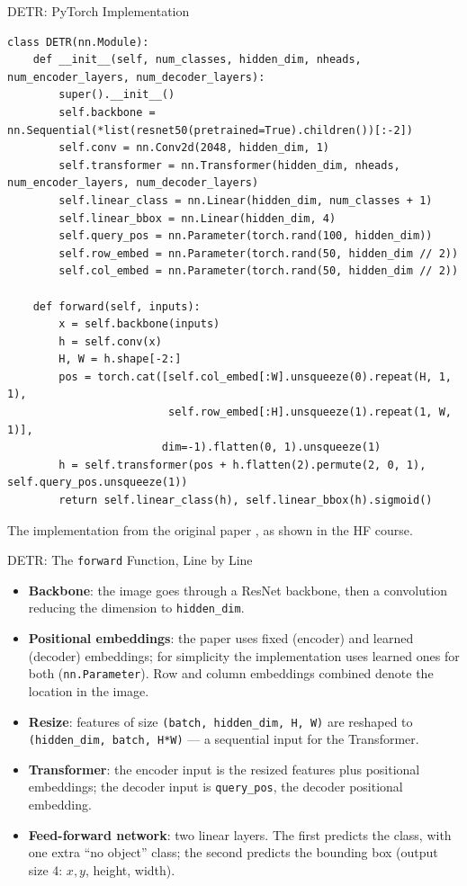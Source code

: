 \begin{frame}[fragile]{DETR: PyTorch Implementation}
\vspace{-0.3cm}
\tiny
\begin{verbatim}
class DETR(nn.Module):
    def __init__(self, num_classes, hidden_dim, nheads, num_encoder_layers, num_decoder_layers):
        super().__init__()
        self.backbone = nn.Sequential(*list(resnet50(pretrained=True).children())[:-2])
        self.conv = nn.Conv2d(2048, hidden_dim, 1)
        self.transformer = nn.Transformer(hidden_dim, nheads, num_encoder_layers, num_decoder_layers)
        self.linear_class = nn.Linear(hidden_dim, num_classes + 1)
        self.linear_bbox = nn.Linear(hidden_dim, 4)
        self.query_pos = nn.Parameter(torch.rand(100, hidden_dim))
        self.row_embed = nn.Parameter(torch.rand(50, hidden_dim // 2))
        self.col_embed = nn.Parameter(torch.rand(50, hidden_dim // 2))

    def forward(self, inputs):
        x = self.backbone(inputs)
        h = self.conv(x)
        H, W = h.shape[-2:]
        pos = torch.cat([self.col_embed[:W].unsqueeze(0).repeat(H, 1, 1),
                         self.row_embed[:H].unsqueeze(1).repeat(1, W, 1)],
                        dim=-1).flatten(0, 1).unsqueeze(1)
        h = self.transformer(pos + h.flatten(2).permute(2, 0, 1), self.query_pos.unsqueeze(1))
        return self.linear_class(h), self.linear_bbox(h).sigmoid()
\end{verbatim}
\normalsize
\vspace{-0.3cm}
{\footnotesize The implementation from the original paper , as shown in the HF course.}
\end{frame}

\begin{frame}{DETR: The \texttt{forward} Function, Line by Line}
\footnotesize%

\begin{itemize}
  \item \textbf{Backbone}: the image goes through a ResNet backbone, then a convolution reducing the dimension to \texttt{hidden\_dim}.
  \item \textbf{Positional embeddings}: the paper uses fixed (encoder) and learned (decoder) embeddings; for simplicity the implementation uses learned ones for both (\texttt{nn.Parameter}). Row and column embeddings combined denote the location in the image.
  \item \textbf{Resize}: features of size \texttt{(batch, hidden\_dim, H, W)} are reshaped to \texttt{(hidden\_dim, batch, H*W)} --- a sequential input for the Transformer.
  \item \textbf{Transformer}: the encoder input is the resized features plus positional embeddings; the decoder input is \texttt{query\_pos}, the decoder positional embedding.
  \item \textbf{Feed-forward network}: two linear layers. The first predicts the class, with one extra \enquote{no object} class; the second predicts the bounding box (output size 4: $x,y$, height, width).
\end{itemize}
\end{frame}

